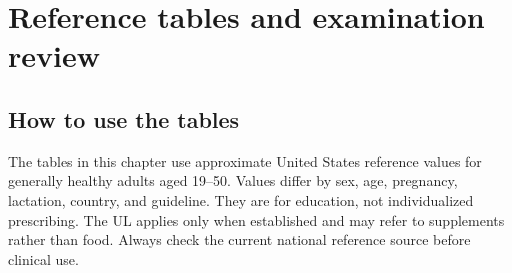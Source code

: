 \chapter{Reference tables and examination review}

\section{How to use the tables}
The tables in this chapter use approximate United States reference values for generally healthy adults aged 19--50. Values differ by sex, age, pregnancy, lactation, country, and guideline. They are for education, not individualized prescribing. The UL applies only when established and may refer to supplements rather than food. Always check the current national reference source before clinical use. \cite{nap}

